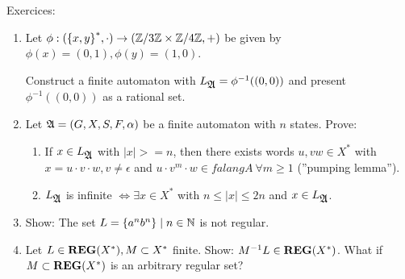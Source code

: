 Exercices:
\begin{enumerate}
  \item Let $\phi : (\mbox{$\{x, y\}$}^*, \cdot) \to (\mathbb{Z} / 3 \mathbb{Z}
  \times \mathbb{Z} / 4 \mathbb{Z}, +)$ be given by $\phi(x) = (0,1), \phi(y) = (1,0)$.
  
  Construct a finite automaton  with $L_{\mbox{$\mathfrak{A}$}} = \phi^{-1}((0,0))$ and
  present $\phi^{-1}((0,0))$ as a rational set.
  
  \item Let $\mbox{$\mathfrak{A}$} = (G, X, S, F, \alpha)$ be a finite automaton with $n$
  states. Prove:
  \begin{enumerate}
    \item If $x \in L_{\mbox{$\mathfrak{A}$}}$ with $|x| >= n$, then there exists words $u, v
    w \in X^*$ with $x = u \cdot v \cdot w, v \neq \epsilon$ and $u \cdot v^m
    \cdot w \in falang{A}\ \forall m \geq 1$ (''pumping lemma'').
    \item $L_{\mbox{$\mathfrak{A}$}}$ is infinite $\Leftrightarrow \exists x \in X^*$ with $n
    \leq |x| \leq 2n$ and $x \in L_{\mbox{$\mathfrak{A}$}}$.
   \end {enumerate}

	\item Show: The set $L = \mbox{$\{a^n b^n\}$} \mid n \in \mathbb{N}$ is not
	regular.
	
	\item Let $L \in \mbox{{\bf REG}}(X^*), M \subset X^*$ finite. Show: $M^{-1}L \in \mbox{{\bf REG}}(X^*)$.
	What if $M \subset \mbox{{\bf REG}}(X^*)$ is an arbitrary regular set?
\end{enumerate}

